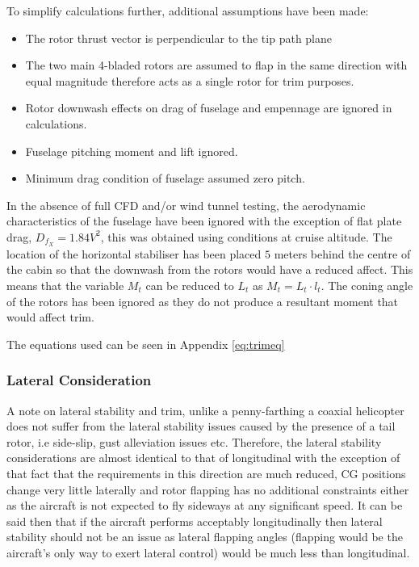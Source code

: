 \documentclass[11pt,a4paper]{article}
\begin{document}
To simplify calculations further, additional assumptions have been made:

\begin{itemize}
    \item The rotor thrust vector is perpendicular to the tip path plane
    \item The two main 4-bladed rotors are assumed to flap in the same direction with equal magnitude therefore acts as a single rotor for trim purposes.
    \item Rotor downwash effects on drag of fuselage and empennage are ignored in calculations.
    \item Fuselage pitching moment and lift ignored.
    \item Minimum drag condition of fuselage assumed zero pitch.
\end{itemize}{}

In the absence of full CFD and/or wind tunnel testing, the aerodynamic characteristics of the fuselage have been ignored with the exception of flat plate drag, $D_{f_X}=1.84V^2$, this was obtained using conditions at cruise altitude.
The location of the horizontal stabiliser has been placed $5$ meters behind the centre of the cabin so that the downwash from the rotors would have a reduced affect. This means that the variable $M_t$ can be reduced to $L_t$ as $M_t=L_t\cdot l_t$. The coning angle of the rotors has been ignored as they do not produce a resultant moment that would affect trim.

The equations used can be seen in Appendix \ref{eq:trimeq}\\


\subsubsection{Lateral Consideration}
A note on lateral stability and trim, unlike a penny-farthing a coaxial helicopter does not suffer from the lateral stability issues caused by the presence of a tail rotor, i.e side-slip, gust alleviation issues etc. Therefore, the lateral stability considerations are almost identical to that of longitudinal with the exception of that fact that the requirements in this direction are much reduced, CG positions change very little laterally and rotor flapping has no additional constraints either as the aircraft is not expected to fly sideways at any significant speed.
It can be said then that if the aircraft performs acceptably longitudinally then lateral stability should not be an issue as lateral flapping angles (flapping would be the aircraft's only way to exert lateral control) would be much less than longitudinal.
\end{document}
